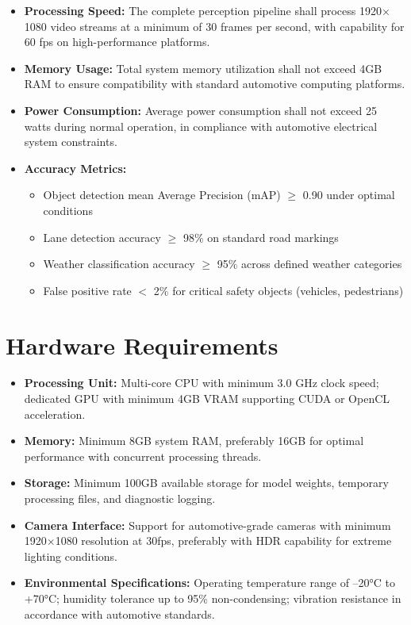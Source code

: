 \begin{itemize}
    \item \textbf{Processing Speed:} The complete perception pipeline shall process 1920$\times$1080 video streams at a minimum of 30 frames per second, with capability for 60 fps on high-performance platforms.
    
    \item \textbf{Memory Usage:} Total system memory utilization shall not exceed 4GB RAM to ensure compatibility with standard automotive computing platforms.
    
    \item \textbf{Power Consumption:} Average power consumption shall not exceed 25 watts during normal operation, in compliance with automotive electrical system constraints.
    
    \item \textbf{Accuracy Metrics:}
    \begin{itemize}
        \item Object detection mean Average Precision (mAP) $\geq$ 0.90 under optimal conditions
        \item Lane detection accuracy $\geq$ 98\% on standard road markings
        \item Weather classification accuracy $\geq$ 95\% across defined weather categories
        \item False positive rate $<$ 2\% for critical safety objects (vehicles, pedestrians)
    \end{itemize}
\end{itemize}

\section{Hardware Requirements}

\begin{itemize}
    \item \textbf{Processing Unit:} Multi-core CPU with minimum 3.0 GHz clock speed; dedicated GPU with minimum 4GB VRAM supporting CUDA or OpenCL acceleration.
    
    \item \textbf{Memory:} Minimum 8GB system RAM, preferably 16GB for optimal performance with concurrent processing threads.
    
    \item \textbf{Storage:} Minimum 100GB available storage for model weights, temporary processing files, and diagnostic logging.
    
    \item \textbf{Camera Interface:} Support for automotive-grade cameras with minimum 1920$\times$1080 resolution at 30fps, preferably with HDR capability for extreme lighting conditions.
    
    \item \textbf{Environmental Specifications:} Operating temperature range of --20°C to +70°C; humidity tolerance up to 95\% non-condensing; vibration resistance in accordance with automotive standards.
\end{itemize}


